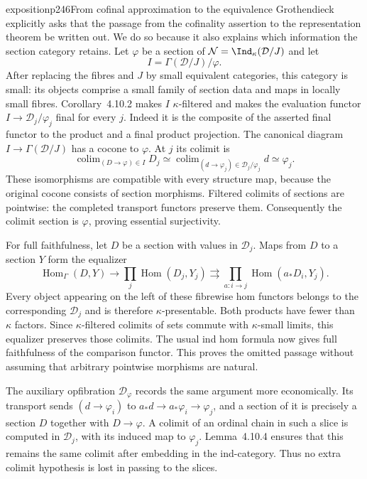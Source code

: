 \begin{dcomment}{exposition}{p246}{From cofinal approximation to the equivalence}
Grothendieck explicitly asks that the passage from the cofinality assertion to the representation theorem be written out. We do so because it also explains which information the section category retains. Let $\varphi$ be a section of $\mathcal N=\Ind_\kappa(\mathcal D/J)$ and let
\[
 I=\Gamma(\mathcal D/J)/\varphi.
\]
After replacing the fibres and $J$ by small equivalent categories, this category is small: its objects comprise a small family of section data and maps in locally small fibres. Corollary~4.10.2 makes $I$ $\kappa$-filtered and makes the evaluation functor $I\to\mathcal D_j/\varphi_j$ final for every $j$. Indeed it is the composite of the asserted final functor to the product and a final product projection. The canonical diagram $I\to\Gamma(\mathcal D/J)$ has a cocone to $\varphi$. At $j$ its colimit is
\[
 \mathop{\mathrm{colim}}_{(D\to\varphi)\in I}D_j
 \simeq\mathop{\mathrm{colim}}_{(d\to\varphi_j)\in\mathcal D_j/\varphi_j}d
 \simeq\varphi_j.
\]
These isomorphisms are compatible with every structure map, because the original cocone consists of section morphisms. Filtered colimits of sections are pointwise: the completed transport functors preserve them. Consequently the colimit section is $\varphi$, proving essential surjectivity.

For full faithfulness, let $D$ be a section with values in $\mathcal D_j$. Maps from $D$ to a section $Y$ form the equalizer
\[
 \operatorname{Hom}_{\Gamma}(D,Y)\longrightarrow
 \prod_j\operatorname{Hom}(D_j,Y_j)
 \rightrightarrows
 \prod_{a:i\to j}\operatorname{Hom}(a_*D_i,Y_j).
\]
Every object appearing on the left of these fibrewise hom functors belongs to the corresponding $\mathcal D_j$ and is therefore $\kappa$-presentable. Both products have fewer than $\kappa$ factors. Since $\kappa$-filtered colimits of sets commute with $\kappa$-small limits, this equalizer preserves those colimits. The usual ind hom formula now gives full faithfulness of the comparison functor. This proves the omitted passage without assuming that arbitrary pointwise morphisms are natural.

The auxiliary opfibration $\mathcal D_\varphi$ records the same argument more economically. Its transport sends $(d\to\varphi_i)$ to $a_*d\to a_*\varphi_i\to\varphi_j$, and a section of it is precisely a section $D$ together with $D\to\varphi$. A colimit of an ordinal chain in such a slice is computed in $\mathcal D_j$, with its induced map to $\varphi_j$. Lemma~4.10.4 ensures that this remains the same colimit after embedding in the ind-category. Thus no extra colimit hypothesis is lost in passing to the slices.
\end{dcomment}


